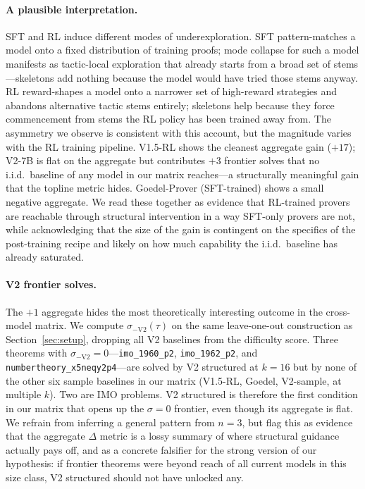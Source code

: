 \documentclass{article}
\begin{document}
\paragraph{A plausible interpretation.} SFT and RL induce different modes of underexploration. SFT pattern-matches a model onto a fixed distribution of training proofs; mode collapse for such a model manifests as tactic-local exploration that already starts from a broad set of stems---skeletons add nothing because the model would have tried those stems anyway. RL reward-shapes a model onto a narrower set of high-reward strategies and abandons alternative tactic stems entirely; skeletons help because they force commencement from stems the RL policy has been trained away from. The asymmetry we observe is consistent with this account, but the magnitude varies with the RL training pipeline. V1.5-RL shows the cleanest aggregate gain ($+17$); V2-7B is flat on the aggregate but contributes $+3$ frontier solves that no i.i.d.\ baseline of any model in our matrix reaches---a structurally meaningful gain that the topline metric hides. Goedel-Prover (SFT-trained) shows a small negative aggregate. We read these together as evidence that RL-trained provers are reachable through structural intervention in a way SFT-only provers are not, while acknowledging that the size of the gain is contingent on the specifics of the post-training recipe and likely on how much capability the i.i.d.\ baseline has already saturated.

\paragraph{V2 frontier solves.} The $+1$ aggregate hides the most theoretically interesting outcome in the cross-model matrix. We compute $\sigma_{-\text{V2}}(\tau)$ on the same leave-one-out construction as Section~\ref{sec:setup}, dropping all V2 baselines from the difficulty score. Three theorems with $\sigma_{-\text{V2}}{=}0$---\texttt{imo\_1960\_p2}, \texttt{imo\_1962\_p2}, and \texttt{numbertheory\_x5neqy2p4}---are solved by V2 structured at $k{=}16$ but by none of the other six sample baselines in our matrix (V1.5-RL, Goedel, V2-sample, at multiple $k$). Two are IMO problems. V2 structured is therefore the first condition in our matrix that opens up the $\sigma{=}0$ frontier, even though its aggregate is flat. We refrain from inferring a general pattern from $n{=}3$, but flag this as evidence that the aggregate $\Delta$ metric is a lossy summary of where structural guidance actually pays off, and as a concrete falsifier for the strong version of our hypothesis: if frontier theorems were beyond reach of all current models in this size class, V2 structured should not have unlocked any.
\end{document}
